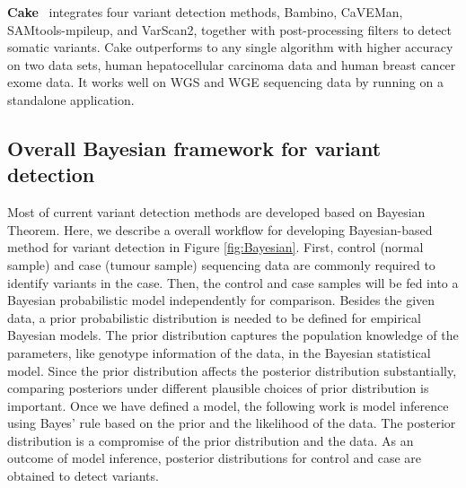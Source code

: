 \documentclass[a4,center,fleqn]{NAR}
\begin{document}
\textbf{Cake}~\citep{rashid2013cake} integrates four variant detection methods, Bambino, CaVEMan, SAMtools-mpileup, and VarScan2, together with post-processing filters to detect somatic variants.
Cake outperforms to any single algorithm with higher accuracy on two data sets, human hepatocellular carcinoma data and human breast cancer exome data.
It works well on WGS and WGE sequencing data by running on a standalone application.




\subsection{Overall Bayesian framework for variant detection}

Most of current variant detection methods are developed based on Bayesian Theorem. 
Here, we describe a overall workflow for developing Bayesian-based method for variant detection in Figure \ref{fig:Bayesian}.
First, control (normal sample) and case (tumour sample) sequencing data are commonly required to identify variants in the case.
Then, the control and case samples will be fed into a Bayesian probabilistic model independently for comparison. 
Besides the given data, a prior probabilistic distribution is needed to be defined for empirical Bayesian models.
The prior distribution captures the population knowledge of the parameters, like genotype information of the data, in the Bayesian statistical model.
Since the prior distribution affects the posterior distribution substantially, comparing posteriors under different plausible choices of prior distribution is important.
Once we have defined a model, the following work is model inference using Bayes' rule based on the prior and the likelihood of the data.
The posterior distribution is a compromise of the prior distribution and the data.
As an outcome of model inference, posterior distributions for control and case are obtained to detect variants.
\end{document}
